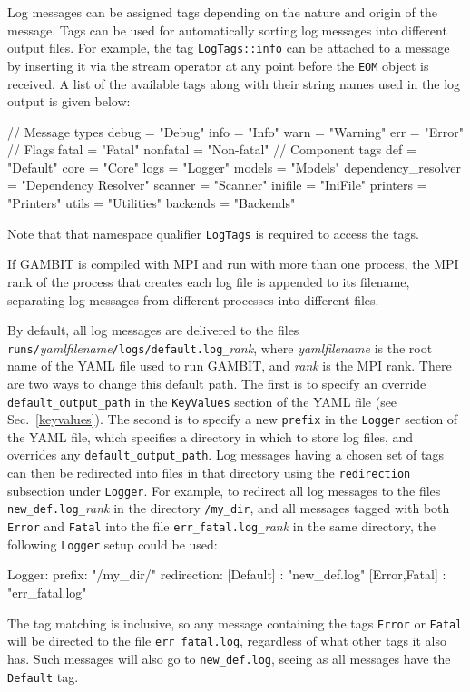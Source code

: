 \documentclass[pdftex,twocolumn,epjc3_preprint,runningheads]{svjour3}
\renewcommand{\_}{\discretionary{\underscore}{}{\underscore}}
\newcommand\yaml[1]{{\lstset{style=yaml}\lstinline!#1!\lstset{style=cpp}}}
\newcommand\term[1]{{\lstset{style=terminal}\lstinline!#1!\lstset{style=cpp}}}
\newcommand{\metavarf}[1]{\textit{\color{darkgreen}\footnotesize\textrm{#1}}}
\newcommand{\metavar}{\metavarf}
\newcommand{\gambit}{\textsf{GAMBIT}\xspace}
\newcommand{\GB}{\gambit}
\newcommand{\mpi}{\textsf{MPI}\xspace}
\newcommand\YAML{\textsf{YAML}\xspace}
\begin{document}
Log messages can be assigned tags depending on the nature and origin of the message. Tags can be used for automatically sorting log messages into different output files. For example, the tag \lstinline{LogTags::info} can be attached to a message by inserting it via the stream operator at any point before the \lstinline{EOM} object is received. A list of the available tags along with their string names used in the log output is given below:
\begin{lstcpp}
// Message types
debug    = "Debug"
info     = "Info"
warn     = "Warning"
err      = "Error"
// Flags
fatal    = "Fatal"
nonfatal = "Non-fatal"
// Component tags
def      = "Default"
core     = "Core"
logs     = "Logger"
models   = "Models"
dependency_resolver = "Dependency Resolver"
scanner  = "Scanner"
inifile  = "IniFile"
printers = "Printers"
utils    = "Utilities"
backends = "Backends"
\end{lstcpp}
Note that that namespace qualifier \lstinline{LogTags} is required to access the tags.

If \GB is compiled with \mpi and run with more than one process, the \mpi rank of the process that creates each log file is appended to its filename, separating log messages from different processes into different files.

By default, all log messages are delivered to the files \yaml{runs/}\metavar{yaml\_filename}\yaml{/logs/default.log_}\metavar{rank}, where \metavar{yaml\_filename} is the root name of the \YAML file used to run \GB, and \metavar{rank} is the \mpi rank. There are two ways to change this default path. The first is to specify an override \yaml{default_output_path} in the \yaml{KeyValues} section of the \YAML file (see Sec.\ \ref{keyvalues}).  The second is to specify a new \yaml{prefix} in the \yaml{Logger} section of the \YAML file, which specifies a directory in which to store log files, and overrides any \yaml{default_output_path}. Log messages having a chosen set of tags can then be redirected into files in that directory using the \yaml{redirection} subsection under \yaml{Logger}. For example, to redirect all log messages to the files \term{new_def.log_}\metavar{rank} in the directory \term{/my_dir}, and all messages tagged with both \yaml{Error} and \yaml{Fatal} into the file \term{err_fatal.log_}\metavar{rank} in the same directory, the following \yaml{Logger} setup could be used:
\begin{lstyaml}
Logger:
  prefix: "/my_dir/"
  redirection:
    [Default]     : "new_def.log"
    [Error,Fatal] : "err_fatal.log"
\end{lstyaml}
The tag matching is inclusive, so any message containing the tags \yaml{Error} or \mbox{\yaml{Fatal}} will be directed to the file \term{err_fatal.log}, regardless of what other tags it also has.  Such messages will also go to \term{new_def.log}, seeing as all messages have the \yaml{Default} tag.
\end{document}
